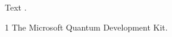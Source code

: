 \documentclass{revtex4-2}
\begin{document}
Text \cite{MS_QDK}.
\begin{thebibliography}{1}
 The Microsoft Quantum Development Kit.
\end{thebibliography}
\end{document}
